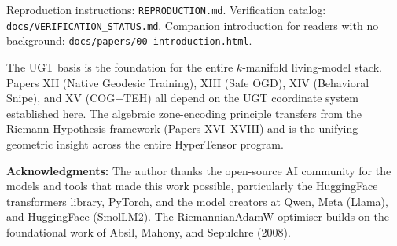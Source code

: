 \documentclass[11pt,a4paper]{article}
\begin{document}
Reproduction instructions: \texttt{REPRODUCTION.md}. Verification catalog: \texttt{docs/VERIFICATION\_STATUS.md}. Companion introduction for readers with no background: \texttt{docs/papers/00-introduction.html}.

The UGT basis is the foundation for the entire $k$-manifold living-model stack. Papers XII (Native Geodesic Training), XIII (Safe OGD), XIV (Behavioral Snipe), and XV (COG+TEH) all depend on the UGT coordinate system established here. The algebraic zone-encoding principle transfers from the Riemann Hypothesis framework (Papers XVI--XVIII) and is the unifying geometric insight across the entire HyperTensor program.

\textbf{Acknowledgments:} The author thanks the open-source AI community for the models and tools that made this work possible, particularly the HuggingFace transformers library, PyTorch, and the model creators at Qwen, Meta (Llama), and HuggingFace (SmolLM2). The RiemannianAdamW optimiser builds on the foundational work of Absil, Mahony, and Sepulchre (2008).
\end{document}

